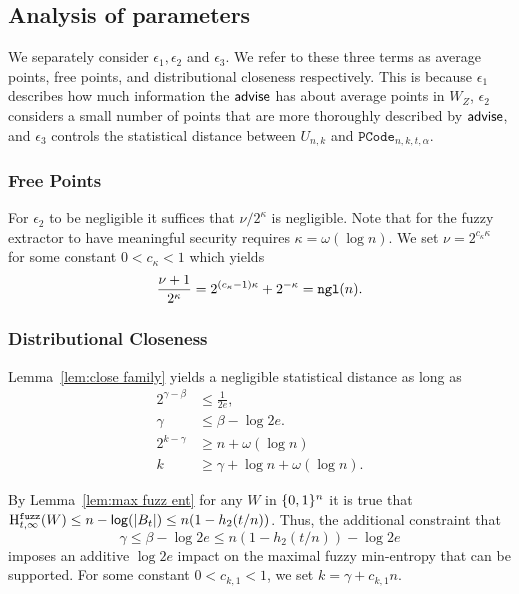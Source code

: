 \subsection{Analysis of parameters}
\label{ssec:analysis params}
We separately consider $\epsilon_1, \epsilon_2$ and $\epsilon_3$. We refer to these three terms as average points, free points, and distributional closeness respectively. This is because $\epsilon_1$ describes how much information the ${\mathsf{advise}}$ has about average points in $W_Z$, $\epsilon_2$ considers a small number of points that are more thoroughly described by ${\mathsf{advise}}$, and $\epsilon_3$ controls the statistical distance between $U_{n, k}$ and $\mathtt{PCode}_{n, k, t, \alpha}$.



\subsubsection{Free Points}
For $\epsilon_2$ to be negligible it suffices that $\nu/2^\kappa$ is negligible.  Note that for the fuzzy extractor to have meaningful security requires $\kappa = \omega(\log{n})$.  We set $\nu = 2^{c_{\kappa}\kappa}$ for some constant $0 < c_{\kappa}<1$ which yields 
\[
\frac{\nu+1}{2^\kappa} = 2^{(c_{\kappa}-1)\kappa}+ 2^{-\kappa} = \mathtt{ngl}(n).
\]
\subsubsection{Distributional Closeness}
 Lemma~\ref{lem:close family} yields a negligible statistical distance as long as 
\begin{align*}
2^{\gamma - \beta} &\le \frac{1}{2e},\\
 \gamma &\le \beta -\log{2e}.\\
2^{k-\gamma}&\ge n+\omega(\log n)\\
k &\ge \gamma + \log{n+ \omega(\log{n})}.
\end{align*}


By Lemma~\ref{lem:max fuzz ent} for any $W$ in $\{0, 1\}^n$ it is true that $\mathrm{H}^{\mathtt{fuzz}}_{t,\infty}(W) \le n -\mathsf{log}\!\left(|B_t|\right) \le n(1-h_2(t/n))$.  Thus, the additional constraint that 
\[
\gamma \le \beta - \log{2e}
\le n(1-h_2(t/n)) - \log{2e}\] imposes an additive $\log{2e}$ impact on the maximal fuzzy min-entropy that can be supported. 
For some constant $0<c_{k,1} < 1$, we set $k = \gamma + c_{k,1}n$. 

